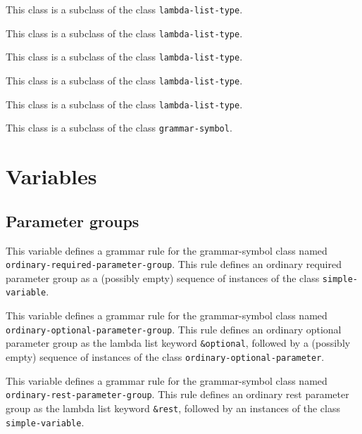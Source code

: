 
This class is a subclass of the class \texttt{lambda-list-type}.


This class is a subclass of the class \texttt{lambda-list-type}.


This class is a subclass of the class \texttt{lambda-list-type}.


This class is a subclass of the class \texttt{lambda-list-type}.


This class is a subclass of the class \texttt{lambda-list-type}.


This class is a subclass of the class \texttt{grammar-symbol}.

\section{Variables}

\subsection{Parameter groups}


This variable defines a grammar rule for the grammar-symbol class
named \texttt{ordinary-required-parameter-group}.  This rule defines
an ordinary required parameter group as a (possibly empty) sequence of
instances of the class \texttt{simple-variable}.


This variable defines a grammar rule for the grammar-symbol class
named \texttt{ordinary-optional-parameter-group}.  This rule defines
an ordinary optional parameter group as the lambda list keyword
\texttt{\&optional}, followed by a (possibly empty) sequence of
instances of the class \texttt{ordinary-optional-parameter}.


This variable defines a grammar rule for the grammar-symbol class
named \texttt{ordinary-rest-parameter-group}.  This rule defines an
ordinary rest parameter group as the lambda list keyword
\texttt{\&rest}, followed by an instances of the class
\texttt{simple-variable}.

